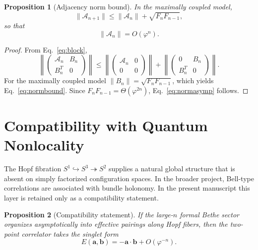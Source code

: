 \documentclass[
  aps,
  prd,
  reprint,
  superscriptaddress,
  nofootinbib,
  longbibliography,
  amsmath,
  amssymb
]{revtex4-2}
\newtheorem{proposition}{Proposition}
\theoremstyle{remark}
\newcommand{\Sthree}{S^{3}}
\newcommand{\phig}{\varphi}
\begin{document}
\begin{proposition}[Adjacency norm bound]
\label{prop:norm}
In the maximally coupled model,
\begin{equation}
\|\mathcal A_{n+1}\|\le \|\mathcal A_n\|+\sqrt{F_nF_{n-1}},
\label{eq:normbound}
\end{equation}
so that
\begin{equation}
\|\mathcal A_n\|=O(\phig^n).
\label{eq:normasymp}
\end{equation}
\end{proposition}

\begin{proof}
From Eq.~\eqref{eq:block},
\begin{equation}
\left\|\begin{pmatrix}
\mathcal A_n & B_n\\
B_n^T & 0
\end{pmatrix}\right\|
\le
\left\|\begin{pmatrix}
\mathcal A_n & 0\\
0 & 0
\end{pmatrix}\right\|
+
\left\|\begin{pmatrix}
0 & B_n\\
B_n^T & 0
\end{pmatrix}\right\|.
\end{equation}
For the maximally coupled model $\|B_n\|=\sqrt{F_nF_{n-1}}$, which yields Eq.~\eqref{eq:normbound}. Since $F_nF_{n-1}=\Theta(\phig^{2n})$, Eq.~\eqref{eq:normasymp} follows.
\end{proof}

\section{Compatibility with Quantum Nonlocality}
\label{sec:nonlocal}

The Hopf fibration $S^1\hookrightarrow \Sthree\twoheadrightarrow S^2$ supplies a natural global structure that is absent on simply factorized configuration spaces. In the broader project, Bell-type correlations are associated with bundle holonomy. In the present manuscript this layer is retained only as a compatibility statement.

\begin{proposition}[Compatibility statement]
\label{prop:bell}
If the large-$n$ formal Bethe sector organizes asymptotically into effective pairings along Hopf fibers, then the two-point correlator takes the singlet form
\begin{equation}
E(\mathbf a,\mathbf b)=-\mathbf a\cdot\mathbf b+O(\phig^{-n}).
\label{eq:bell}
\end{equation}
\end{proposition}
\end{document}
